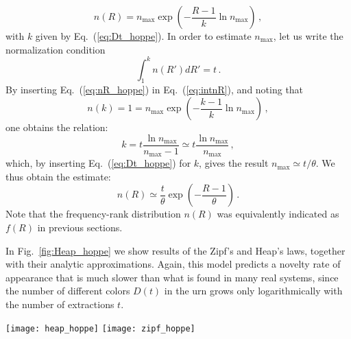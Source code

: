 \documentclass[graybox]{svmult}
\begin{document}
\begin{equation}\label{eq:nR_hoppe}
n(R) =n_{\max} \exp{\left(-\frac{R-1}{k}\ln {n_{\max}}\right)} \,,
\end{equation}
%
with $k$ given by Eq.~(\ref{eq:Dt_hoppe}). 
In order to estimate $n_{\max}$, let us write the normalization condition
\begin{equation}\label{eq:intnR}
 \int_{1}^{k} n(R') dR'  =t \,.
\end{equation}
%
By inserting Eq.~(\ref{eq:nR_hoppe})
in Eq.~(\ref{eq:intnR}),  and noting that
\begin{equation}
n(k) = 1 = n_{\max} \exp{\left(-\frac{k-1}{k}\ln {n_{\max}}\right)}  \,,
\end{equation}
%
one obtains the relation:
%
\begin{equation}
k= t \frac{\ln {n_{\max}}}{n_{\max} -1} \simeq  t \frac{\ln
  {n_{\max}}}{n_{\max}} \,, 
\end{equation}
%
which, by inserting Eq.~(\ref{eq:Dt_hoppe}) for
$k$, gives the result $ n_{\max} \simeq t/\theta$.  We thus obtain the
estimate:
%
\begin{equation}\label{eq:nR_hoppe_final}
n(R) \simeq \frac{t}{\theta} \exp{\left(-\frac{R-1}{\theta} \right)} \,.
\end{equation}
Note that the frequency-rank distribution $n(R)$ was equivalently indicated as $f(R)$ in previous sections.

In Fig.~\ref{fig:Heap_hoppe}  we show results of the Zipf's and Heap's laws,
together with their analytic approximations.
Again, this model predicts a novelty rate of appearance that is much slower than what is found in many real systems, since the number of
different colors $D(t)$ in the urn grows only logarithmically with the number of
extractions $t$. 


\begin{figure*}[t]
\centering
\texttt{[image: heap\_hoppe]}%
\texttt{[image: zipf\_hoppe]}
\caption{ {\bf Zipf's and Heap's laws in the Hoppe urn model.}
 Left:
  Heap's law in the Hoppe urn model for different values of the black
  ball mass $\theta$. Curves correspond to averages
  over $100$ processes. Straight lines correspond to
  Eq.~(\ref{eq:Dt_hoppe}), for each value of $\theta$.
Right:
  Zipf's law in the Hoppe urn model for different values of the black
  ball mass $\theta$. Curves correspond to averages
  over $100$ processes (standard errors are reported). Straight lines correspond to
  Eq.~(\ref{eq:nR_hoppe_final}), for each value of $\theta$, and for the
  length of the process $t=10^7$. 
\label{fig:Heap_hoppe}
  }
\end{figure*}
\end{document}
